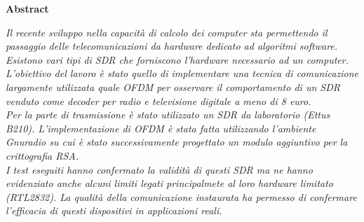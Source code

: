 \thispagestyle{empty}

\begin{center}
  {\bf \Huge Abstract}
\end{center}

\vspace{4cm}


\emph{
	Il recente sviluppo nella capacità di calcolo dei computer sta permettendo il passaggio delle telecomunicazioni da hardware dedicato ad algoritmi software. Esistono vari tipi di SDR che forniscono l'hardware necessario ad un computer.\\ L'obiettivo del lavoro è stato quello di implementare una tecnica di comunicazione largamente utilizzata quale OFDM per osservare il comportamento di un SDR venduto come decoder per radio e televisione digitale a meno di 8 euro.\\ Per la parte di trasmissione è stato utilizzato un SDR da laboratorio (Ettus B210). L'implementazione di OFDM è stata fatta utilizzando l'ambiente Gnuradio su cui è stato successivamente progettato un modulo aggiuntivo per la crittografia RSA.\\ I test eseguiti hanno confermato la validità di questi SDR ma ne hanno evidenziato anche alcuni limiti legati principalmete al loro hardware limitato (RTL2832). La qualità della comunicazione instaurata ha permesso di confermare l'efficacia di questi dispositivi in applicazioni reali.}
